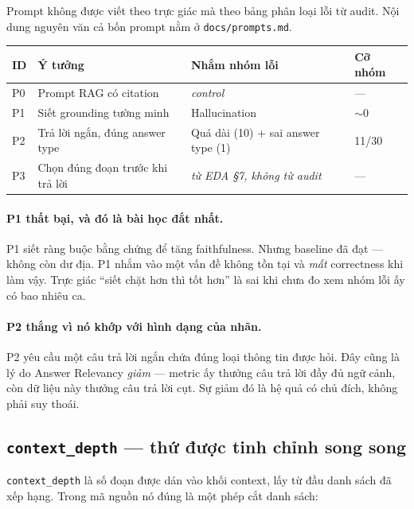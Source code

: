 Prompt không được viết theo trực giác mà theo bảng phân loại lỗi từ audit. Nội
dung nguyên văn cả bốn prompt nằm ở \texttt{docs/prompts.md}.

\begin{center}\small
\begin{tabularx}{0.94\textwidth}{@{}p{0.9cm} p{3.4cm} L p{1.2cm}@{}}
\toprule
\textbf{ID} & \textbf{Ý tưởng} & \textbf{Nhắm nhóm lỗi} & \textbf{Cỡ nhóm} \\
\midrule
P0 & Prompt RAG có citation & \emph{control} & --- \\
P1 & Siết grounding tường minh & Hallucination & $\sim$0 \\
P2 & Trả lời ngắn, đúng answer type & Quá dài (10) $+$ sai answer type (1) & 11/30 \\
P3 & Chọn đúng đoạn trước khi trả lời & \emph{từ EDA \S7, không từ audit} & --- \\
\bottomrule
\end{tabularx}
\end{center}

\paragraph{P1 thất bại, và đó là bài học đắt nhất.}
P1 siết ràng buộc bằng chứng để tăng faithfulness. Nhưng baseline đã đạt
\NumPzeroFaith{} --- không còn dư địa. P1 nhắm vào một vấn đề không tồn tại và
\emph{mất} correctness khi làm vậy. Trực giác ``siết chặt hơn thì tốt hơn'' là
sai khi chưa đo xem nhóm lỗi ấy có bao nhiêu ca.

\paragraph{P2 thắng vì nó khớp với hình dạng của nhãn.}
P2 yêu cầu một câu trả lời ngắn chứa đúng loại thông tin được hỏi. Đây cũng là
lý do Answer Relevancy \emph{giảm} --- metric ấy thưởng câu trả lời đầy đủ ngữ
cảnh, còn dữ liệu này thưởng câu trả lời cụt. Sự giảm đó là hệ quả có chủ đích,
không phải suy thoái.

\subsection{\texttt{context\_depth} --- thứ được tinh chỉnh song song}

\texttt{context\_depth} là số đoạn được dán vào khối context, lấy từ đầu danh
sách đã xếp hạng. Trong mã nguồn nó đúng là một phép cắt danh sách:

